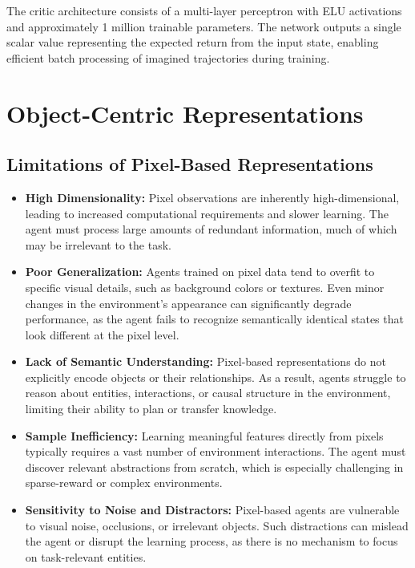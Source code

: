 \documentclass[
	english,
	ruledheaders=section,
	class=report,
	thesis={type=master},
	accentcolor=9c,
	custommargins=true,
	marginpar=false,
	parskip=half-,
	fontsize=11pt,
]{tudapub}
\begin{document}
The critic architecture consists of a multi-layer perceptron with ELU activations and approximately 1 million trainable parameters. The network outputs a single scalar value representing the expected return from the input state, enabling efficient batch processing of imagined trajectories during training.



\section{Object-Centric Representations}
\label{sec:object_centric}

\subsection{Limitations of Pixel-Based Representations}
\label{subsec:pixel_limitations}


\begin{itemize}
	\item \textbf{High Dimensionality:} Pixel observations are inherently high-dimensional, leading to increased computational requirements and slower learning. The agent must process large amounts of redundant information, much of which may be irrelevant to the task.
	\item \textbf{Poor Generalization:} Agents trained on pixel data tend to overfit to specific visual details, such as background colors or textures. Even minor changes in the environment's appearance can significantly degrade performance, as the agent fails to recognize semantically identical states that look different at the pixel level.
	\item \textbf{Lack of Semantic Understanding:} Pixel-based representations do not explicitly encode objects or their relationships. As a result, agents struggle to reason about entities, interactions, or causal structure in the environment, limiting their ability to plan or transfer knowledge.
	\item \textbf{Sample Inefficiency:} Learning meaningful features directly from pixels typically requires a vast number of environment interactions. The agent must discover relevant abstractions from scratch, which is especially challenging in sparse-reward or complex environments.
	\item \textbf{Sensitivity to Noise and Distractors:} Pixel-based agents are vulnerable to visual noise, occlusions, or irrelevant objects. Such distractions can mislead the agent or disrupt the learning process, as there is no mechanism to focus on task-relevant entities.
\end{itemize}
\end{document}
